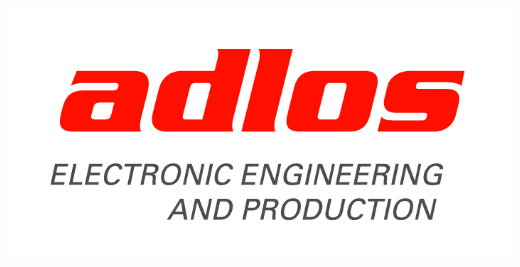 \begin{titlepage}
\begin{center}
\begin{verbatim}


\end{verbatim}

\includegraphics[height=0.05\textheight]{Deckblatt/Adlos.jpg}
\end{center}
\end{titlepage}
